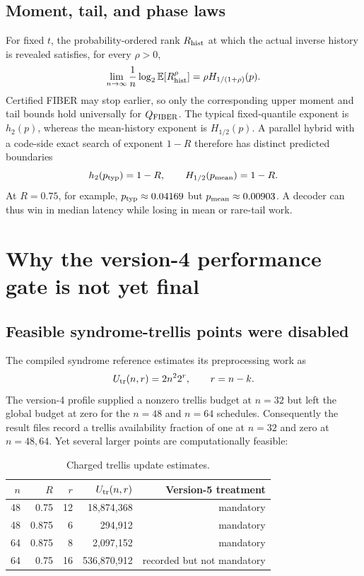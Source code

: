 \documentclass[11pt]{article}
\theoremstyle{definition}
\theoremstyle{remark}
\newcommand{\hbin}{h_2}
\newcommand{\Renyi}{H}
\begin{document}
\subsection{Moment, tail, and phase laws}
For fixed $t$, the probability-ordered rank $R_{\rm hist}$ at which the actual inverse history is revealed satisfies, for every $\rho>0$,
\[
 \lim_{n\to\infty}\frac1n\log_2\mathbb E[R_{\rm hist}^{\rho}]
 = \rho\Renyi_{1/(1+\rho)}(p).
\]
Certified FIBER may stop earlier, so only the corresponding upper moment and tail bounds hold universally for $Q_{\rm FIBER}$.  The typical fixed-quantile exponent is $\hbin(p)$, whereas the mean-history exponent is $\Renyi_{1/2}(p)$.  A parallel hybrid with a code-side exact search of exponent $1-R$ therefore has distinct predicted boundaries
\[
 \hbin(p_{\rm typ})=1-R,
 \qquad
 \Renyi_{1/2}(p_{\rm mean})=1-R.
\]
At $R=0.75$, for example, $p_{\rm typ}\approx0.04169$ but $p_{\rm mean}\approx0.00903$.  A decoder can thus win in median latency while losing in mean or rare-tail work.

\section{Why the version-4 performance gate is not yet final}
\subsection{Feasible syndrome-trellis points were disabled}
The compiled syndrome reference estimates its preprocessing work as
\[
 U_{\rm tr}(n,r)=2n^2 2^r,
 \qquad r=n-k.
\]
The version-4 profile supplied a nonzero trellis budget at $n=32$ but left the global budget at zero for the $n=48$ and $n=64$ schedules.  Consequently the result files record a trellis availability fraction of one at $n=32$ and zero at $n=48,64$.  Yet several larger points are computationally feasible:

\begin{table}[h]
\centering
\caption{Charged trellis update estimates.}
\begin{tabular}{@{}rrrrr@{}}
\toprule
$n$ & $R$ & $r$ & $U_{\rm tr}(n,r)$ & Version-5 treatment\\
\midrule
48 & 0.75  & 12 & 18,874,368  & mandatory\\
48 & 0.875 & 6  & 294,912     & mandatory\\
64 & 0.875 & 8  & 2,097,152   & mandatory\\
64 & 0.75  & 16 & 536,870,912 & recorded but not mandatory\\
\bottomrule
\end{tabular}
\end{table}
\end{document}
